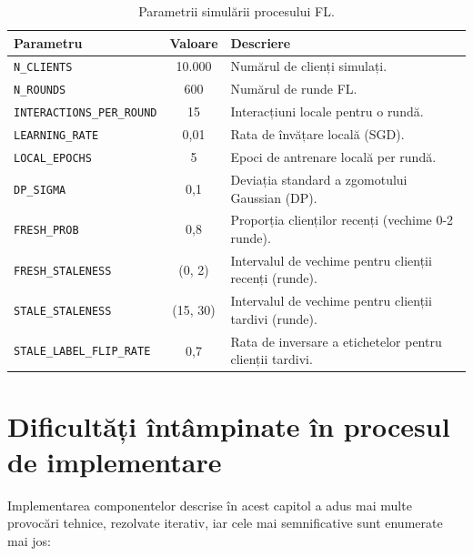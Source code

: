 \documentclass[12pt,a4paper]{report}
\begin{document}
\begin{table}[h]
\centering
\scriptsize
\caption{Parametrii simulării procesului FL.}
\label{tab:simulare-fl}
\begin{tabular}{|p{4.5cm}|c|p{7.5cm}|}
\hline
\textbf{Parametru} & \textbf{Valoare} & \textbf{Descriere} \\
\hline
\texttt{N\_CLIENTS} & 10.000 & Numărul de clienți simulați. \\
\hline
\texttt{N\_ROUNDS} & 600 & Numărul de runde FL. \\
\hline
\texttt{INTERACTIONS\_PER\_ROUND} & 15 & Interacțiuni locale pentru o rundă. \\
\hline
\texttt{LEARNING\_RATE} & 0,01 & Rata de învățare locală (SGD). \\
\hline
\texttt{LOCAL\_EPOCHS} & 5 & Epoci de antrenare locală per rundă. \\
\hline
\texttt{DP\_SIGMA} & 0,1 & Deviația standard a zgomotului Gaussian (DP). \\
\hline
\texttt{FRESH\_PROB} & 0,8 & Proporția clienților recenți (vechime 0-2 runde). \\
\hline
\texttt{FRESH\_STALENESS} & (0, 2) & Intervalul de vechime pentru clienții recenți (runde). \\
\hline
\texttt{STALE\_STALENESS} & (15, 30) & Intervalul de vechime pentru clienții tardivi (runde). \\
\hline
\texttt{STALE\_LABEL\_FLIP\_RATE} & 0,7 & Rata de inversare a etichetelor pentru clienții tardivi. \\
\hline
\end{tabular}
\end{table}

\section{Dificultăți întâmpinate în procesul de implementare}

Implementarea componentelor descrise în acest capitol a adus mai multe provocări tehnice, rezolvate iterativ, iar cele mai semnificative sunt enumerate mai jos:
\end{document}
